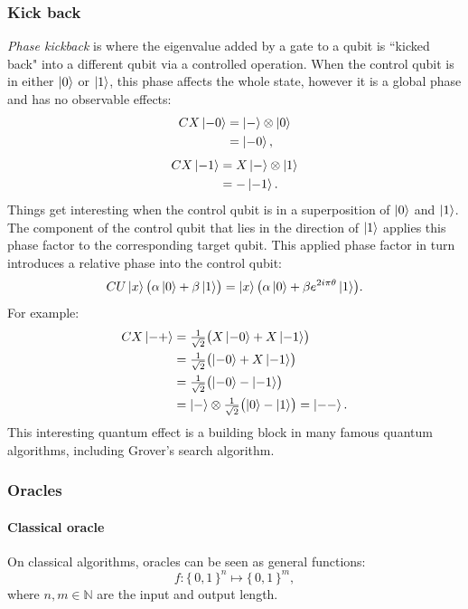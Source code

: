 \documentclass{article}
\newcommand*{\Nset}{\mathbb{N}}
\begin{document}
\subsubsection{Kick back}
\emph{Phase kickback} is where the eigenvalue added by a gate to a qubit is
``kicked back" into a different qubit via a controlled operation.
When the control qubit is in either $\ket{0}$ or $\ket{1}$, this phase affects
the whole state, however it is a global phase and has no observable effects:
\begin{align*}
  CX \ket{-0}
  & = \ket{-} \otimes \ket{0} \\
  & = \ket{-0},
\end{align*}
\begin{align*}
  CX \ket{-1}
  & = X\ket{-} \otimes \ket{1} \\
  & = -\ket{-1}.
\end{align*}
Things get interesting when the control qubit is in a superposition of
$\ket{0}$ and $\ket{1}$.
The component of the control qubit that lies in the direction of  $\ket{1}$
applies this phase factor to the corresponding target qubit. This applied phase
factor in turn introduces a relative phase into the control qubit:
\[
CU \ket{x} \bigl(\alpha \ket{0} + \beta \ket{1} \bigr) =
\ket{x} \bigl(\alpha \ket{0} + \beta e^{2 i \pi \theta} \ket{1} \bigr).
\]
For example:
\begin{align*}
  CX \ket{-+}
  & = \tfrac{1}{\sqrt{2}} \bigl( X\ket{-0} + X\ket{-1} \bigr) \\
  & = \tfrac{1}{\sqrt{2}} \bigl( \ket{-0} + X\ket{-1} \bigr) \\
  & = \tfrac{1}{\sqrt{2}} \bigl( \ket{-0} - \ket{-1} \bigr) \\
  & = \ket{-} \otimes \tfrac{1}{\sqrt{2}} \bigl( \ket{0} - \ket{1} \bigr) =
      \ket{--}.\\
\end{align*}
This interesting quantum effect is a building block in many
famous quantum algorithms, including Grover's search algorithm.

\subsubsection{Oracles}

\paragraph{Classical oracle}
On classical algorithms, oracles can be seen as general functions:
\[
  f: \{\, 0, 1 \,\}^n \mapsto \{\, 0, 1 \,\}^m,
\]
where $n, m \in \Nset$ are the input and output length.
\end{document}
